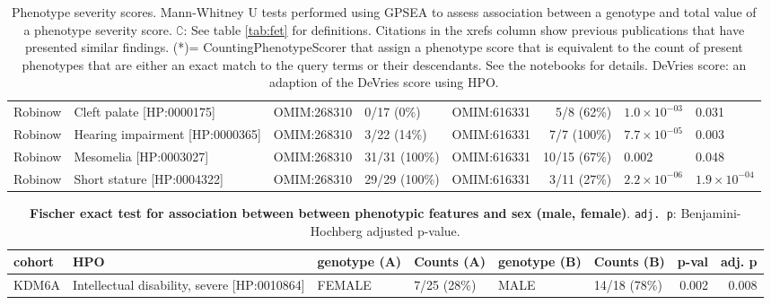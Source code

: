 \begin{table}
\begin{tabular}{l>{\raggedright\arraybackslash}p{2.5cm}>{\raggedright\arraybackslash}p{2.5cm}>{\raggedright}p{4cm}lr}
Robinow & Cleft palate [HP:0000175] & OMIM:268310 & 0/17 (0\%) & OMIM:616331 & 5/8 (62\%) & $1.0 \times 10^{-03}$ & 0.031\\
Robinow & Hearing impairment [HP:0000365] & OMIM:268310 & 3/22 (14\%) & OMIM:616331 & 7/7 (100\%) & $7.7 \times 10^{-05}$ & 0.003\\
Robinow & Mesomelia [HP:0003027] & OMIM:268310 & 31/31 (100\%) & OMIM:616331 & 10/15 (67\%) & 0.002 & 0.048\\
Robinow & Short stature [HP:0004322] & OMIM:268310 & 29/29 (100\%) & OMIM:616331 & 3/11 (27\%) & $2.2 \times 10^{-06}$ & $1.9 \times 10^{-04}$\\
\bottomrule
\end{tabular}
\caption{Phenotype severity scores. Mann-Whitney U tests performed using GPSEA to assess association between a genotype and total value of a phenotype severity score. $\complement$: See table \ref{tab:fet} for definitions.
    Citations in the xrefs column show previous publications that have presented similar findings. (*)= CountingPhenotypeScorer that assign a phenotype score that is equivalent to the count of present phenotypes that are either an exact match to the query terms or their descendants. See the notebooks for details. DeVries score: an adaption of the DeVries score \cite{PMID_34521999} using HPO.}
\label{tab:phenoscore}
\end{table}
\clearpage
\newpage


\begin{table}
\centering
\begin{tabular}{l>{\raggedright}p{4cm}lp{2cm}lp{2.4cm}rr}
\toprule
\textbf{cohort} & \textbf{HPO} & \textbf{genotype (A)} & \textbf{Counts (A)} & \textbf{genotype (B)} & \textbf{Counts (B)} & \textbf{p-val} & \textbf{adj. p}\\
\midrule
KDM6A & Intellectual disability, severe [HP:0010864] & FEMALE & 7/25 (28\%) & MALE & 14/18 (78\%) & 0.002 & 0.008\\
\bottomrule
\end{tabular}
\caption{\textbf{Fischer exact test for association between  between phenotypic features and sex (male, female)}. \texttt{adj. p}: Benjamini-Hochberg adjusted p-value.}
\label{tab:mf_hpo}
\end{table}




